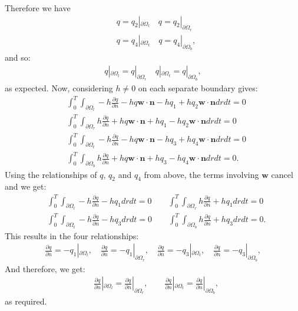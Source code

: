 \documentclass[11pt, a4paper]{article}
\theoremstyle{definition}
\newcommand{\w}{\mathbf{w}}
\newcommand{\n}{\mathbf{n}}
\begin{document}
	Therefore we have 
	\begin{align*}
		&q = q_2 |_{\partial \Omega_l} \quad q =  q_2 |_{\partial \Omega_r}\\
		&q = q_4 |_{\partial \Omega_t} \quad q =  q_4 |_{\partial \Omega_b},
	\end{align*}
	and so:
	\begin{align*}
		q |_{\partial \Omega_l} = q |_{\partial \Omega_r} \quad q |_{\partial \Omega_t} = q|_{\partial \Omega_b},
	\end{align*}
	as expected.
	Now, considering $h \neq 0$ on each separate boundary gives:
	\begin{align*}
		&\int_0^T \int_{\partial \Omega_l} - h \frac{\partial q}{\partial n}  - h q \w \cdot \n - h q_1 + h q_2 \w \cdot \n dr dt = 0\\
		&\int_0^T \int_{\partial \Omega_r}  h \frac{\partial q}{\partial n}  + h q \w \cdot \n + h q_1 - h q_2 \w \cdot \n dr dt = 0 \\
		&\int_0^T \int_{\partial \Omega_t}- h \frac{\partial q}{\partial n}  - h q \w \cdot \n - h q_3 + h q_4 \w \cdot \n dr dt = 0 \\
		&\int_0^T \int_{\partial \Omega_b} h \frac{\partial q}{\partial n}  + h q \w \cdot \n + h q_3 - h q_4 \w \cdot \n dr dt = 0 .
	\end{align*}
	Using the relationships of $q$, $q_2$ and $q_4$ from above, the terms involving $\w$ cancel and we get:
	\begin{align*}
		&\int_0^T \int_{\partial \Omega_l} - h \frac{\partial q}{\partial n}   - h q_1 dr dt = 0 \qquad \int_0^T \int_{\partial \Omega_r}  h \frac{\partial q}{\partial n}  + h q_1 dr dt = 0 \\
		&\int_0^T \int_{\partial \Omega_t}- h \frac{\partial q}{\partial n}   - h q_3 dr dt = 0 \qquad
		\int_0^T \int_{\partial \Omega_b} h \frac{\partial q}{\partial n}   + h q_3  dr dt = 0 .
	\end{align*}
	This results in the four relationships:
	\begin{align*}
		\frac{\partial q}{\partial n} = - q_1 |_{\partial \Omega_l}, \quad \frac{\partial q}{\partial n} = - q_1 |_{\partial \Omega_r}, \quad
		\frac{\partial q}{\partial n} = - q_3 |_{\partial \Omega_t}, \quad
		\frac{\partial q}{\partial n} = - q_3 |_{\partial \Omega_b},
	\end{align*}
	And therefore, we get:
	\begin{align*}
		&\frac{\partial q}{\partial n}|_{\partial \Omega_l} = \frac{\partial q}{\partial n}|_{\partial \Omega_r}, \qquad \frac{\partial q}{\partial n}|_{\partial \Omega_t} = \frac{\partial q}{\partial n}|_{\partial \Omega_b},
	\end{align*}
	as required.
\end{document}
